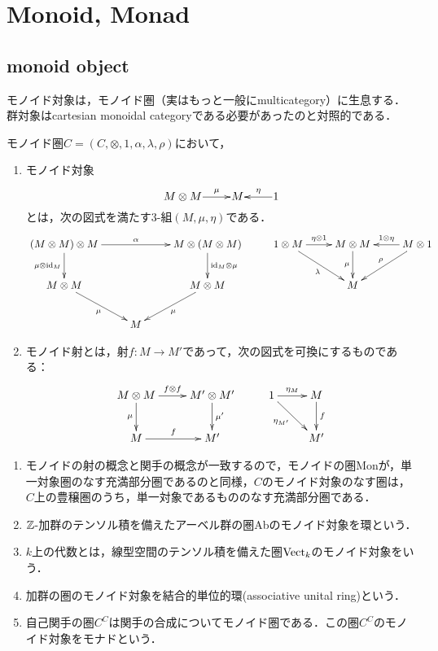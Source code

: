 \documentclass[uplatex,dvipdfmx]{jsreport}
\begin{document}
\section{Monoid, Monad}

\subsection{monoid object}

\begin{tcolorbox}[colframe=ForestGreen, colback=ForestGreen!10!white, breakable ,colbacktitle=ForestGreen!40!white, coltitle=black,fonttitle=\bfseries\sffamily,
    title=]
    モノイド対象は，モノイド圏（実はもっと一般にmulticategory）に生息する．
    群対象はcartesian monoidal categoryである必要があったのと対照的である．
\end{tcolorbox}

\begin{definition}
    モノイド圏$C=(C,\otimes,1,\alpha,\lambda,\rho)$において，
    \begin{enumerate}
        \item モノイド対象
        \[\xymatrix@1{
            M\otimes M\ar[r]^-{\mu}&M&1\ar[l]_-\eta
        }\]
        とは，次の図式を満たす3-組$(M,\mu,\eta)$である．
        \[\xymatrix{
            (M\otimes M)\otimes M\ar[d]_-{\mu\otimes\id_M}\ar[rr]^-{\alpha}&&M\otimes(M\otimes M)\ar[d]^-{\id_M\otimes\mu}&1\otimes M\ar[r]^-{\eta\otimes 1}\ar[dr]_-{\lambda}&M\otimes M\ar[d]_-{\mu}&M\otimes 1\ar[l]_-{1\otimes\eta}\ar[dl]_-{\rho}\\
            M\otimes M\ar[dr]_-\mu&&M\otimes M\ar[dl]^-\mu&&M\\
            &M
        }\]
        \item モノイド射とは，射$f:M\to M'$であって，次の図式を可換にするものである：
        \[\xymatrix{
            M\otimes M\ar[r]^-{f\otimes f}\ar[d]_-\mu&M'\otimes M'\ar[d]^-{\mu'}&1\ar[r]^-{\eta_M}\ar[dr]_-{\eta_{M'}}&M\ar[d]^-f\\
            M\ar[r]^-{f}&M'&&M'
        }\]
    \end{enumerate}
\end{definition}
\begin{example}\mbox{}
    \begin{enumerate}
        \item モノイドの射の概念と関手の概念が一致するので，モノイドの圏Monが，単一対象圏のなす充満部分圏であるのと同様，$C$のモノイド対象のなす圏は，$C$上の豊穣圏のうち，単一対象であるもののなす充満部分圏である．
        \item $\mathbb{Z}$-加群のテンソル積を備えたアーベル群の圏Abのモノイド対象を環という．
        \item $k$上の代数とは，線型空間のテンソル積を備えた圏$\mathrm{Vect}_k$のモノイド対象をいう．
        \item 加群の圏のモノイド対象を結合的単位的環(associative unital ring)という．
        \item 自己関手の圏$C^C$は関手の合成についてモノイド圏である．この圏$C^C$のモノイド対象をモナドという．
    \end{enumerate}
\end{example}
\end{document}
